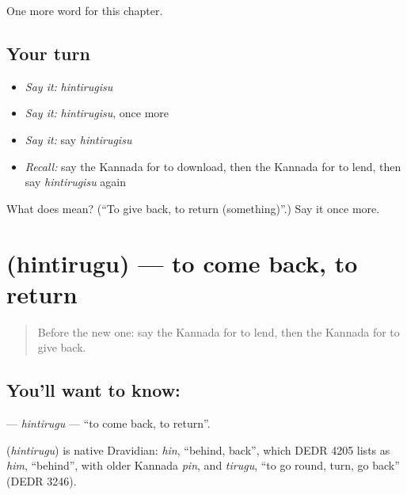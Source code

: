\begin{grammarlens}[title={What you've built}]
One more word for this chapter.
\end{grammarlens}

\subsection*{Your turn}
\begin{itemize}
\raggedright
  \item \emph{Say it:} \emph{hintirugisu}
  \item \emph{Say it:} \emph{hintirugisu}, once more
  \item \emph{Say it:} say \emph{hintirugisu}
  \item \emph{Recall:} say the Kannada for to download, then the Kannada for to lend, then say \emph{hintirugisu} again
\end{itemize}

\begin{tcolorbox}[breakable,colback=teal!4,colframe=teal!35!black,title={Before you move on}]
What does  mean? (\textquotedblleft{}To give back, to return (something)\textquotedblright{}.) Say it once more.
\end{tcolorbox}
\section[\texorpdfstring{\kn{ಹಿಂತಿರುಗು} (hintirugu)}{ಹಿಂತಿರುಗು (hintirugu)}]{ (hintirugu) — to come back, to return}

\label{lesson:KA-C278-hintirugu}



\begin{quote}
Before the new one: say the Kannada for to lend, then the Kannada for to give back.
\end{quote}

\subsection*{You'll want to know: }
\textbf{} — \emph{hintirugu} — \textquotedblleft{}to come back, to return\textquotedblright{}.

\begin{cousinweb}
\textbf{} (\emph{hintirugu}) is native Dravidian: \emph{hin}, \textquotedblleft{}behind, back\textquotedblright{}, which DEDR 4205 lists as \emph{him}, \textquotedblleft{}behind\textquotedblright{}, with older Kannada \emph{pin}, and \emph{tirugu}, \textquotedblleft{}to go round, turn, go back\textquotedblright{} (DEDR 3246).
\end{cousinweb}

